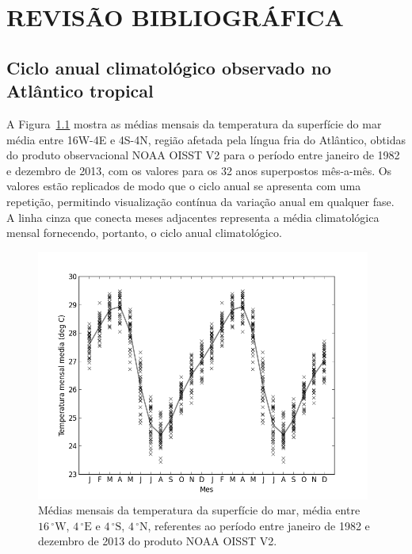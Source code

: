 \chapter{REVISÃO BIBLIOGRÁFICA}




\section{Ciclo anual climatológico observado no Atlântico tropical}

A Figura~\ref{fig:oisst_act_clim} mostra as médias mensais da temperatura da superfície do mar média entre 16W-4E e 4S-4N, região afetada pela língua fria do Atlântico, obtidas do produto observacional NOAA OISST V2 para o período entre janeiro de 1982 e dezembro de 2013, com os valores para os 32 anos superpostos mês-a-mês. Os valores estão replicados de modo que o ciclo anual se apresenta com uma repetição, permitindo visualização contínua da variação anual em qualquer fase. A linha cinza que conecta meses adjacentes representa a média climatológica mensal fornecendo, portanto, o ciclo anual climatológico.

\begin{figure}[h!]
\centering
\includegraphics[width=11cm]{figuras/OISST_AtlanticColdTongue.png}
\caption{Médias mensais da temperatura da superfície do mar, média entre $16\,^{\circ}\mathrm{W}$, $4\,^{\circ}\mathrm{E}$ e $4\,^{\circ}\mathrm{S}$, $4\,^{\circ}\mathrm{N}$, referentes ao período entre janeiro de 1982 e dezembro de 2013 do produto NOAA OISST V2.}
\label{fig:oisst_act_clim}
\end{figure}

